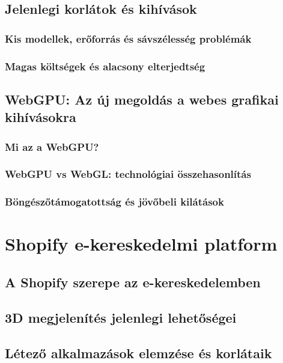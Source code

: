 \documentclass[12pt]{report}
\begin{document}
        
        \section{Jelenlegi korlátok és kihívások}
        \subsection{Kis modellek, erőforrás és sávszélesség problémák}
        \subsection{Magas költségek és alacsony elterjedtség}
        \section{WebGPU: Az új megoldás a webes grafikai kihívásokra}
        \subsection{Mi az a WebGPU?}
        \subsection{WebGPU vs WebGL: technológiai összehasonlítás}
        \subsection{Böngészőtámogatottság és jövőbeli kilátások}
        
        \chapter{Shopify e-kereskedelmi platform}\label{ch:shopify}
        \section{A Shopify szerepe az e-kereskedelemben}
        \section{3D megjelenítés jelenlegi lehetőségei}
        \section{Létező alkalmazások elemzése és korlátaik}
\end{document}
